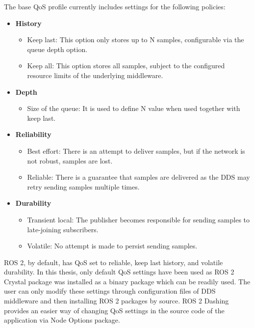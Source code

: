 \documentclass[%
xelatex,
	oneside,		%
	12pt,			%
	parskip=half,	%
	abstracton,
	chapterprefix=true%
    appendixprefix=true]
{scrbook}
\begin{document}
\vspace*{0.25cm}
	
The base QoS profile currently includes settings for the following policies:
\begin{itemize}

\item {\bfseries History}
\begin{itemize}
\item Keep last: This option only stores up to N samples, configurable via the queue depth option.

\item Keep all: This option stores all samples, subject to the configured resource limits of the underlying middleware.
\end{itemize}
\item {\bfseries Depth}
\begin{itemize}
\item Size of the queue: It is used to define N value when used together with keep last.
\end{itemize}
\item {\bfseries Reliability}
\begin{itemize}
\item Best effort: There is an attempt to deliver samples, but if the network is not robust, samples are lost.

\item Reliable: There is a guarantee that samples are delivered as the DDS may retry sending samples multiple times.
\end{itemize}
\item {\bfseries Durability}
\begin{itemize}
\item Transient local: The publisher becomes responsible for sending samples to late-joining subscribers.

\item Volatile: No attempt is made to persist sending samples.\cite{qos}
\end{itemize}
\end{itemize}

ROS 2, by default, has QoS set to reliable, keep last history, and volatile durability. In this thesis, only default QoS settings have been used as ROS 2 Crystal package was installed as a binary package which can be readily used. The user can only modify these settings through configuration files of DDS middleware and then installing ROS 2 packages by source. ROS 2 Dashing provides an easier way of changing QoS settings in the source code of the application via Node Options package.
\end{document}
